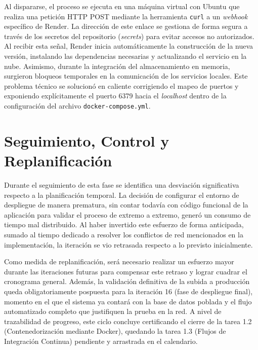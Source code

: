 Al dispararse, el proceso se ejecuta en una máquina virtual con Ubuntu que realiza una petición HTTP POST mediante la herramienta \texttt{curl} a un \textit{webhook} específico de Render. La dirección de este enlace se gestiona de forma segura a través de los secretos del repositorio (\textit{secrets}) para evitar accesos no autorizados. Al recibir esta señal, Render inicia automáticamente la construcción de la nueva versión, instalando las dependencias necesarias y actualizando el servicio en la nube. Asimismo, durante la integración del almacenamiento en memoria, surgieron bloqueos temporales en la comunicación de los servicios locales. Este problema técnico se solucionó en caliente corrigiendo el mapeo de puertos y exponiendo explícitamente el puerto 6379 hacia el \textit{localhost} dentro de la configuración del archivo \texttt{docker-compose.yml}.

\section{Seguimiento, Control y Replanificación}
Durante el seguimiento de esta fase se identifica una desviación significativa respecto a la planificación temporal. La decisión de configurar el entorno de despliegue de manera prematura, sin contar todavía con código funcional de la aplicación para validar el proceso de extremo a extremo, generó un consumo de tiempo mal distribuido. Al haber invertido este esfuerzo de forma anticipada, sumado al tiempo dedicado a resolver los conflictos de red mencionados en la implementación, la iteración se vio retrasada respecto a lo previsto inicialmente.

Como medida de replanificación, será necesario realizar un esfuerzo mayor durante las iteraciones futuras para compensar este retraso y lograr cuadrar el cronograma general. Además, la validación definitiva de la subida a producción queda obligatoriamente pospuesta para la iteración 16 (fase de despliegue final), momento en el que el sistema ya contará con la base de datos poblada y el flujo automatizado completo que justifiquen la prueba en la red. A nivel de trazabilidad de progreso, este ciclo concluye certificando el cierre de la tarea 1.2 (Contenedorización mediante Docker), quedando la tarea 1.3 (Flujos de Integración Continua) pendiente y arrastrada en el calendario.
